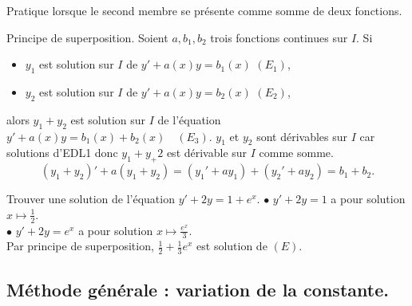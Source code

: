 \documentclass[11pt]{article}
\begin{document}
Pratique lorsque le second membre se présente comme somme de deux fonctions.

\begin{prop}{Principe de superposition.}{}
    Soient $a,b_1,b_2$ trois fonctions continues sur $I$. Si
    \begin{itemize}
        \item $y_1$ est solution sur $I$ de $y'+a(x)y=b_1(x)$ \quad $(E_1)$,
        \item $y_2$ est solution sur $I$ de $y'+a(x)y=b_2(x)$ \quad $(E_2)$,
    \end{itemize}
    alors $y_1+y_2$ est solution sur $I$ de l'équation $y'+a(x)y=b_1(x)+b_2(x)\quad (E_3)$.
    \tcblower
    $y_1$ et $y_2$ sont dérivables sur $I$ car solutions d'EDL1 donc $y_1+y_+2$ est dérivable sur $I$ comme somme.
    \begin{equation*}
        (y_1+y_2)'+a(y_1+y_2)=(y_1'+ay_1) + (y_2' + ay_2) = b_1 + b_2.
    \end{equation*}
\end{prop}

\begin{ex}{}{}
    Trouver une solution de l'équation $y'+2y=1+e^x$.
    \tcblower
    $\bullet$ $y'+2y=1$ a pour solution $x\mapsto\frac{1}{2}$.\\
    $\bullet$ $y'+2y=e^x$ a pour solution $x\mapsto\frac{e^x}{3}$.\\
    Par principe de superposition, $\frac{1}{2}+\frac{1}{3}e^x$ est solution de $(E)$.
\end{ex}

\subsection{Méthode générale : variation de la constante.}
\end{document}
